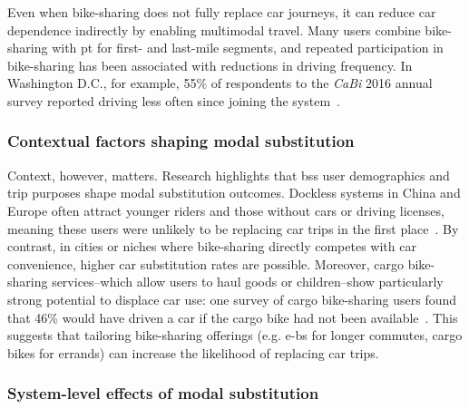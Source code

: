 Even when bike-sharing does not fully replace car journeys, it can reduce car dependence indirectly by enabling multimodal travel. Many users combine bike-sharing with \ac{pt} for first- and last-mile segments, and repeated participation in bike-sharing has been associated with reductions in driving frequency. In Washington D.C., for example, 55\% of respondents to the \textit{CaBi} 2016 annual survey reported driving less often since joining the system~\cite{NACTO2020}.

    \subsubsection{Contextual factors shaping modal substitution}

Context, however, matters. Research highlights that \ac{bss} user demographics and trip purposes shape modal substitution outcomes. Dockless systems in China and Europe often attract younger riders and those without cars or driving licenses, meaning these users were unlikely to be replacing car trips in the first place~\cite{Ma2020, Bosehans2024}. By contrast, in cities or niches where bike-sharing directly competes with car convenience, higher car substitution rates are possible. Moreover, cargo bike-sharing services--which allow users to haul goods or children--show particularly strong potential to displace car use: one survey of cargo bike-sharing users found that 46\% would have driven a car if the cargo bike had not been available~\cite{Becker2018}. This suggests that tailoring bike-sharing offerings (e.g. \acp{e-b} for longer commutes, cargo bikes for errands) can increase the likelihood of replacing car trips.

    \subsubsection{System-level effects of modal substitution}

